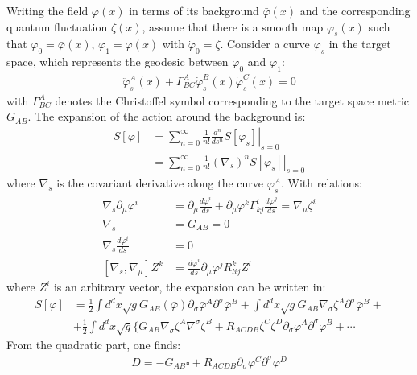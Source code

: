 \documentclass[fleqn]{article}
\begin{document}
Writing the field $\varphi(x)$ in terms of its background $\bar{\varphi} (x)$ and the corresponding quantum fluctuation $\zeta(x)$, assume that there is a smooth map $\varphi _s(x)$ such that $\varphi _0 = \bar{\varphi}(x)$, $\varphi _1 = \varphi (x)$ with $\dot{\varphi}_0 = \zeta$. Consider a curve $\varphi _s$ in the target space, which represents the geodesic between $\varphi_0$ and $\varphi _1$:
\begin{align}
\ddot{\varphi} _{s}^{A} (x) + \Gamma _{BC} ^{A} \dot{\varphi}_s ^{B} (x) \dot{\varphi}_s ^C(x) = 0
\end{align}
with $\Gamma _{BC}^{A}$ denotes the Christoffel symbol corresponding to the target space metric $G_{AB}$. The expansion of the action around the background is:
\begin{align}
S[\varphi] &= \left. \sum _{n=0} ^{\infty} \frac{1}{n!} \frac{d^{n}}{ds^{n}} S[\varphi _s] \right|_{s=0} \nonumber \\
&= \left. \sum_{n=0} ^{\infty} \frac{1}{n!}(\nabla _s)^{n} S[\varphi _s] \right|_{s=0} 
\end{align}
where $\nabla _s$ is the covariant derivative along the curve $\varphi _s ^A$. With relations:
\begin{align}
\nabla _s \partial _{\mu} \varphi ^{i} &= \partial_{\mu} \frac{d\varphi ^i}{ds} + \partial _{\mu} \varphi ^k \Gamma _{kj}^i \frac{d\varphi ^j}{ds} = \nabla_{\mu} \zeta ^i \\
\nabla_s &= G_{AB} = 0 \\
\nabla _s \frac{d\varphi ^i}{ds} &= 0\\
[\nabla_s , \nabla _{\mu}] Z^{k} &= \frac{d\varphi^i}{ds} \partial _{\mu} \varphi ^j R_{lij}^k Z^l
\end{align}
where $Z^i$ is an arbitrary vector, the expansion can be written in:
\begin{align}
S[\varphi] &= \frac{1}{2} \int d^{d}x \sqrt{g} G_{AB}(\bar{\varphi})  \partial _{\sigma}\bar{\varphi}^{A} \partial ^{\sigma} \bar{\varphi}^B + \int d^{d}x \sqrt{g} G_{AB}\nabla _{\sigma} \zeta ^{A} \partial ^{\sigma} \bar{\varphi}^{B} + \nonumber \\
&+ \frac{1}{2} \int d^{d}x \sqrt{g} \lbrace G_{AB} \nabla_{\sigma} \zeta ^{A} \nabla^{\sigma} \zeta ^{B} + R_{ACDB} \zeta ^{C} \zeta ^{D} \partial _{\sigma} \bar{\varphi}^{A} \partial ^{\sigma}\bar{\varphi}^{B} + \cdots
\end{align}
From the quadratic part, one finds:
\begin{align}
D = -G_{AB} \square + R_{ACDB} \partial _{\sigma} \varphi^{C} \partial ^{\sigma} \varphi^{D}
\end{align}
\end{document}

